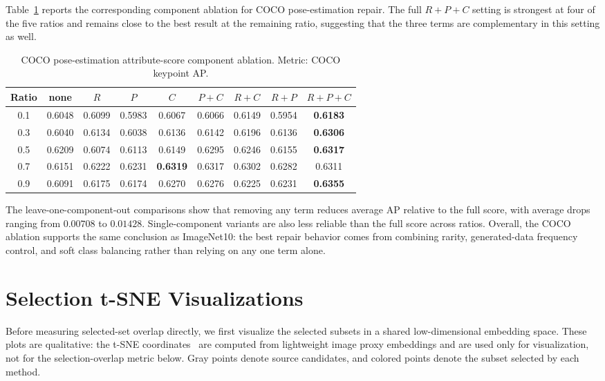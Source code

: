 \documentclass{article}
\begin{document}
Table~\ref{tab:coco-rpc-ablation} reports the corresponding component ablation for COCO pose-estimation repair. The full $R+P+C$ setting is strongest at four of the five ratios and remains close to the best result at the remaining ratio, suggesting that the three terms are complementary in this setting as well.

\begin{table}[h]
\centering
\caption{COCO pose-estimation attribute-score component ablation. Metric: COCO keypoint AP.}
\label{tab:coco-rpc-ablation}
\small
\setlength{\tabcolsep}{4pt}
\begin{tabular}{c c c c c c c c c}
\toprule
Ratio & none & $R$ & $P$ & $C$ & $P+C$ & $R+C$ & $R+P$ & $R+P+C$ \\
\midrule
0.1 & 0.6048 & 0.6099 & 0.5983 & 0.6067 & 0.6066 & 0.6149 & 0.5954 & \textbf{0.6183} \\
0.3 & 0.6040 & 0.6134 & 0.6038 & 0.6136 & 0.6142 & 0.6196 & 0.6136 & \textbf{0.6306} \\
0.5 & 0.6209 & 0.6074 & 0.6113 & 0.6149 & 0.6295 & 0.6246 & 0.6155 & \textbf{0.6317} \\
0.7 & 0.6151 & 0.6222 & 0.6231 & \textbf{0.6319} & 0.6317 & 0.6302 & 0.6282 & 0.6311 \\
0.9 & 0.6091 & 0.6175 & 0.6174 & 0.6270 & 0.6276 & 0.6225 & 0.6231 & \textbf{0.6355} \\
\bottomrule
\end{tabular}
\end{table}

The leave-one-component-out comparisons show that removing any term reduces average AP relative to the full score, with average drops ranging from $0.00708$ to $0.01428$. Single-component variants are also less reliable than the full score across ratios. Overall, the COCO ablation supports the same conclusion as ImageNet10: the best repair behavior comes from combining rarity, generated-data frequency control, and soft class balancing rather than relying on any one term alone.

\section{Selection t-SNE Visualizations}
\label{app:selection-tsne}

Before measuring selected-set overlap directly, we first visualize the selected subsets in a shared low-dimensional embedding space. These plots are qualitative: the t-SNE coordinates~\citep{van2008visualizing} are computed from lightweight image proxy embeddings and are used only for visualization, not for the selection-overlap metric below. Gray points denote source candidates, and colored points denote the subset selected by each method.
\end{document}
